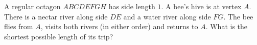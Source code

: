 A regular octagon $ABCDEFGH$ has side length $1$. A bee's hive is at vertex $A$. There is a nectar river along side $DE$ and a water river along side $FG$. The bee flies from $A$, visits both rivers (in either order) and returns to $A$. What is the shortest possible length of its trip?
